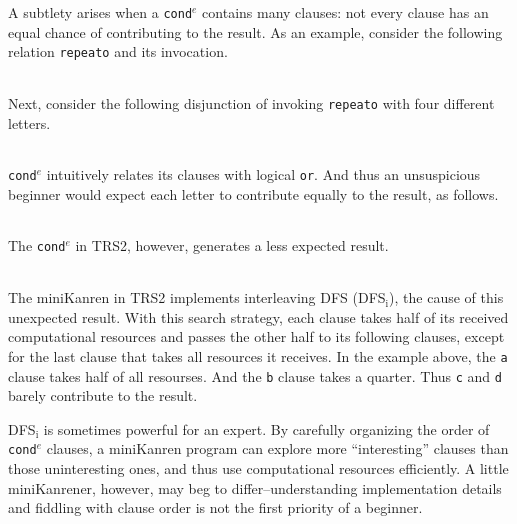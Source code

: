 \documentclass[format=acmlarge, review=true, authordraft=true]{acmart}
\newcommand{\conde}{\texttt{cond$^e$}}
\newcommand{\clisting}[1]{
\begin{center}
  \begin{tabular}{c}
	
    \end{tabular}
\end{center}
}
\newcommand{\DFSi }[0]{DFS$_\textrm{i}$}
\begin{document}

A subtlety arises 
when a \conde{} contains many clauses: not every clause has an 
equal chance of contributing to the result. As an example, consider the following 
relation \texttt{repeato} and its invocation. 

\clisting{Figures/repeato.rkt}

Next, consider the following disjunction of invoking \texttt{repeato} with four 
different letters.

\clisting{Figures/example.rkt}

\conde{} intuitively relates its clauses with logical \texttt{or}. And thus an 
unsuspicious beginner would expect each letter to contribute equally to the 
result, as follows.

\clisting{Figures/run-repeato-fair.rkt}

The \conde{} in TRS2, however, generates a less expected result.

\clisting{Figures/run-repeato-idfs.rkt}

The miniKanren in TRS2 implements interleaving DFS (\DFSi), the cause of this 
unexpected result. With this search strategy, each clause takes half 
of its received computational resources and passes the other half to its 
following clauses, except for the last clause that takes all resources it 
receives. In the example above, the \texttt{a} clause takes half of all 
resourses. And the \texttt{b} clause takes a quarter. Thus \texttt{c} and 
\texttt{d} barely contribute to the result.


\DFSi{} is sometimes powerful for an expert. By carefully organizing the order 
of \conde{} clauses, a miniKanren program can explore more ``interesting'' 
clauses than those uninteresting ones, and thus use computational resources 
efficiently. A little miniKanrener, however, may beg to differ--understanding
implementation details and fiddling with clause order is not the first
priority of a beginner.
\end{document}
